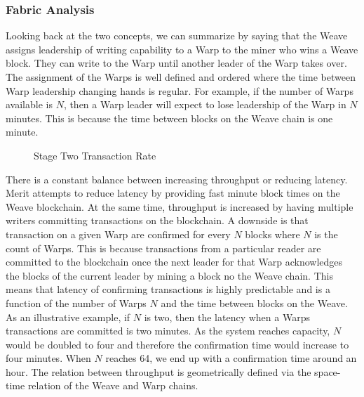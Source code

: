 \documentclass{article}
\begin{document}
\subsubsection{Fabric Analysis}

Looking back at the two concepts, we can summarize by saying that the Weave
assigns leadership of writing capability to a Warp to the miner who wins a Weave block.
They can write to the Warp until another leader of the Warp takes over. The assignment
of the Warps is well defined and ordered where the time between Warp leadership
changing hands is regular. For example, if the number of Warps available is $N$, then
a Warp leader will expect to lose leadership of the Warp in $N$ minutes. This
is because the time between blocks on the Weave chain is one minute. 

\begin{figure}[H]
    \caption{Stage Two Transaction Rate}
\end{figure}

There is a constant balance between increasing throughput or reducing latency.
Merit attempts to reduce latency by providing fast minute block times on the Weave
blockchain. At the same time, throughput is increased by having multiple writers
committing transactions on the blockchain. A downside is that transaction on a given
Warp are confirmed for every $N$ blocks where $N$ is the count of Warps. This is
because transactions from a particular reader are committed to the blockchain once
the next leader for that Warp acknowledges the blocks of the current leader by
mining a block no the Weave chain. This means that latency of confirming transactions
is highly predictable and is a function of the number of Warps $N$ and the time
between blocks on the Weave. As an illustrative example, if $N$ is two, then the
latency when a Warps transactions are committed is two minutes. As the system reaches
capacity, $N$ would be doubled to four and therefore the confirmation time would
increase to four minutes. When $N$ reaches 64, we end up with a confirmation time
around an hour. The relation between throughput is geometrically defined via the
space-time relation of the Weave and Warp chains.
\end{document}
